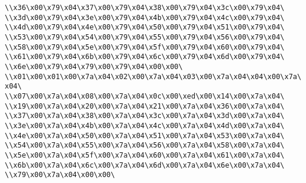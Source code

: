 \verb|\\x36\x00\x79\x04\x37\x00\x79\x04\x38\x00\x79\x04\x3c\x00\x79\x04\|\newline
\verb|\\x3d\x00\x79\x04\x3e\x00\x79\x04\x4b\x00\x79\x04\x4c\x00\x79\x04\|\newline
\verb|\\x4d\x00\x79\x04\x4e\x00\x79\x04\x50\x00\x79\x04\x51\x00\x79\x04\|\newline
\verb|\\x53\x00\x79\x04\x54\x00\x79\x04\x55\x00\x79\x04\x56\x00\x79\x04\|\newline
\verb|\\x58\x00\x79\x04\x5e\x00\x79\x04\x5f\x00\x79\x04\x60\x00\x79\x04\|\newline
\verb|\\x61\x00\x79\x04\x6b\x00\x79\x04\x6c\x00\x79\x04\x6d\x00\x79\x04\|\newline
\verb|\\x6e\x00\x79\x04\x79\x00\x79\x04\x00\x00\|\newline
\verb|\\x01\x00\x01\x00\x7a\x04\x02\x00\x7a\x04\x03\x00\x7a\x04\x04\x00\x7a\x04\|\newline
\verb|\\x07\x00\x7a\x04\x08\x00\x7a\x04\x0c\x00\xed\x00\x14\x00\x7a\x04\|\newline
\verb|\\x19\x00\x7a\x04\x20\x00\x7a\x04\x21\x00\x7a\x04\x36\x00\x7a\x04\|\newline
\verb|\\x37\x00\x7a\x04\x38\x00\x7a\x04\x3c\x00\x7a\x04\x3d\x00\x7a\x04\|\newline
\verb|\\x3e\x00\x7a\x04\x4b\x00\x7a\x04\x4c\x00\x7a\x04\x4d\x00\x7a\x04\|\newline
\verb|\\x4e\x00\x7a\x04\x50\x00\x7a\x04\x51\x00\x7a\x04\x53\x00\x7a\x04\|\newline
\verb|\\x54\x00\x7a\x04\x55\x00\x7a\x04\x56\x00\x7a\x04\x58\x00\x7a\x04\|\newline
\verb|\\x5e\x00\x7a\x04\x5f\x00\x7a\x04\x60\x00\x7a\x04\x61\x00\x7a\x04\|\newline
\verb|\\x6b\x00\x7a\x04\x6c\x00\x7a\x04\x6d\x00\x7a\x04\x6e\x00\x7a\x04\|\newline
\verb|\\x79\x00\x7a\x04\x00\x00\|\newline
